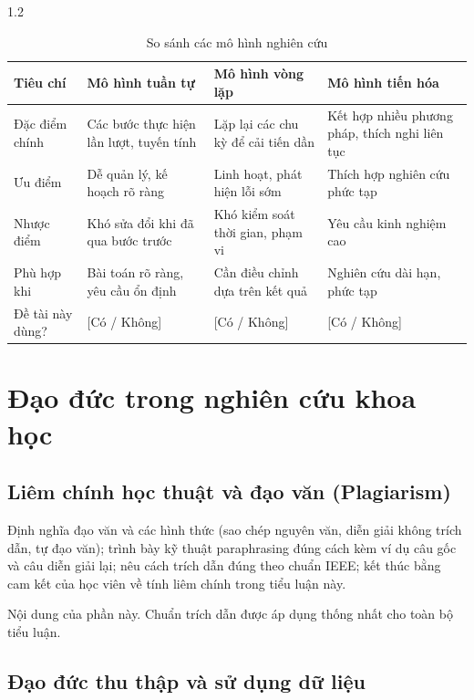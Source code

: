 \begin{spacing}{1.2}
\begin{table}[htpb]
\centering
\caption{So sánh các mô hình nghiên cứu}
\label{tab:mo_hinh_nc}
\renewcommand{\arraystretch}{1.3}
{\fontsize{12}{14}\selectfont
\begin{tabularx}{\textwidth}{|>{\raggedright\arraybackslash}p{2.8cm}|X|X|X|}
\hline
\textbf{Tiêu chí} & \textbf{Mô hình tuần tự} & \textbf{Mô hình vòng lặp} & \textbf{Mô hình tiến hóa} \\
\hline
Đặc điểm chính & Các bước thực hiện lần lượt, tuyến tính & Lặp lại các chu kỳ để cải tiến dần & Kết hợp nhiều phương pháp, thích nghi liên tục \\
\hline
Ưu điểm & Dễ quản lý, kế hoạch rõ ràng & Linh hoạt, phát hiện lỗi sớm & Thích hợp nghiên cứu phức tạp \\
\hline
Nhược điểm & Khó sửa đổi khi đã qua bước trước & Khó kiểm soát thời gian, phạm vi & Yêu cầu kinh nghiệm cao \\
\hline
Phù hợp khi & Bài toán rõ ràng, yêu cầu ổn định & Cần điều chỉnh dựa trên kết quả & Nghiên cứu dài hạn, phức tạp \\
\hline
Đề tài này dùng? & [Có / Không] & [Có / Không] & [Có / Không] \\
\hline
\end{tabularx}
}
\end{table}

\section{Đạo đức trong nghiên cứu khoa học}
\label{sec:dao_duc}

\subsection{Liêm chính học thuật và đạo văn (Plagiarism)}
\label{subsec:dao_van}

\begin{huongdan}
Định nghĩa đạo văn và các hình thức (sao chép nguyên văn, diễn giải không trích dẫn, tự đạo văn); trình bày kỹ thuật paraphrasing đúng cách kèm ví dụ câu gốc và câu diễn giải lại; nêu cách trích dẫn đúng theo chuẩn IEEE; kết thúc bằng cam kết của học viên về tính liêm chính trong tiểu luận này.
\end{huongdan}

Nội dung của phần này. Chuẩn trích dẫn  được áp dụng thống nhất cho toàn bộ tiểu luận.

\subsection{Đạo đức thu thập và sử dụng dữ liệu}
\label{subsec:dao_duc_du_lieu}


\end{spacing}
